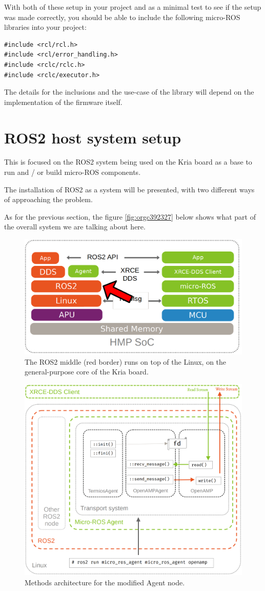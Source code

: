 \documentclass[10pt]{article}
\begin{document}
\pagebreak
With both of these setup in your project and as a minimal test to see if the setup was made correctly,
you should be able to include the following micro-ROS libraries into your project:
\begin{verbatim}
#include <rcl/rcl.h>
#include <rcl/error_handling.h>
#include <rclc/rclc.h>
#include <rclc/executor.h>
\end{verbatim}

The details for the inclusions and the use-case of the library will depend on the implementation
of the firmware itself.
\clearpage
\section{ROS2 host system setup}
\label{sec:orgfd8d394}
This is focused on the ROS2 system being used on the Kria board as a base to run and / or build
micro-ROS components.

The installation of ROS2 as a system will be presented, with
two different ways of approaching the problem.

As for the previous section, the figure \ref{fig:orgc392327} below shows what part
of the overall system we are talking about here.

\begin{figure}[htbp]
\centering
\includegraphics[width=.6\textwidth]{./img/map_ros.png}
\caption{\label{fig:org1cb5190}The ROS2 middle (red border) runs on top of the Linux, on the general-purpose core of the Kria board.}
\end{figure}

\begin{figure}[htbp]
\centering
\includegraphics[width=.55\textwidth]{./img/agent_arch.png}
\caption{\label{fig:org4e85ca7}Methods architecture for the modified Agent node.}
\end{figure}
\end{document}
